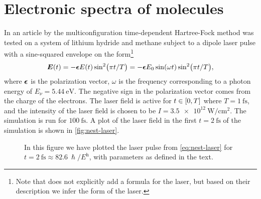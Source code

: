    \section{Electronic spectra of molecules}
        \label{sec:nest}
        In an article by \citeauthor{nest} \cite{nest} the
        multiconfiguration time-dependent Hartree-Fock method was tested on
        a system of lithium hydride and methane subject to a dipole
        laser pulse with a sine-squared envelope on the form\footnote{%
            Note that \citeauthor{nest} \cite{nest} does not explicitly add
            a formula for the laser, but based on their description we infer
            the form of the laser.
        }
        \begin{align}
            \boldsymbol{E}(t)
            = -\boldsymbol{\epsilon} E(t)
            \sin[2](\pi t / T)
            = -\boldsymbol{\epsilon} E_0 \sin(\omega t)
            \sin[2](\pi t / T),
            \label{eq:nest-laser}
        \end{align}
        where $\boldsymbol{\epsilon}$ is the polarization vector, $\omega$ is the
        frequency corresponding to a photon energy of $E_{\nu} =
        \SI{5.44}{\electronvolt}$.
        The negative sign in the polarization vector comes from the charge of
        the electrons.
        The laser field is active for $t \in \left[ 0, T \right]$ where $T =
        \SI{1}{\femto\second}$, and the intensity of the laser field is chosen
        to be $I = \SI{3.5e12}{\watt/\cm^2}$.
        The simulation is run for $\SI{100}{\femto\second}$.
        A plot of the laser field in the first $t = \SI{2}{\femto\second}$ of
        the simulation is shown in \autoref{fig:nest-laser}.
        \begin{figure}
            \centering
            \caption{In this figure we have plotted the laser pulse from
            \autoref{eq:nest-laser} for $t = \SI{2}{\femto\second} \approx
            \SI{82.6}{\hslash / \hartree}$, with parameters as defined in the
            text.}
            \label{fig:nest-laser}
        \end{figure}
